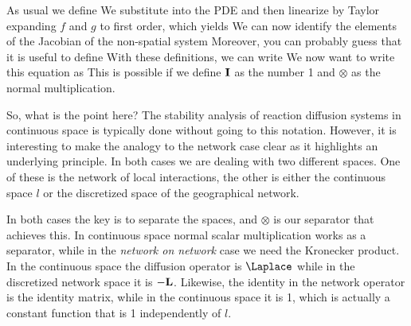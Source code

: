 \solution 
As usual we define 
We substitute into the PDE and then linearize by Taylor expanding $f$ and $g$ to first order, which yields
We can now identify the elements of the Jacobian of the non-spatial system 
Moreover, you can probably guess that it is useful to define 
With these definitions, we can write
We now want to write this equation as 
This is possible if we define $\bf I$ as the number 1 and $\otimes$ as the normal multiplication. 

So, what is the point here? The stability analysis of reaction diffusion systems in continuous space is typically done without going to this notation. However, it is interesting to make the analogy to the network case clear as it highlights an underlying principle. In both cases we are dealing with two different spaces. One of these is the network of local interactions, the other is either the continuous space $l$ or the discretized space of the geographical network. 

In both cases the key is to separate the spaces, and $\otimes$ is our separator that achieves this. In continuous space normal scalar multiplication works as a separator, while in the \emph{network on network} case we need the Kronecker product. In the continuous space the diffusion operator is $\Laplace$ while in the discretized network space it is $-{\bf L}$. Likewise, the identity in the network operator is the identity matrix, while in the continuous space it is 1, which is actually a constant function that is 1 independently of $l$. 

